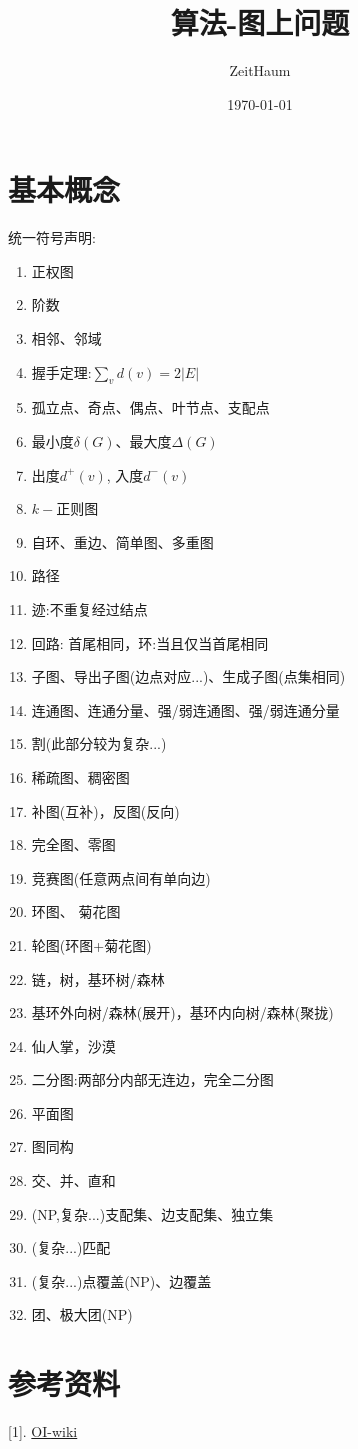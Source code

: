 \documentclass{article}
\author{ZeitHaum}
\date{\today}
\title{算法-图上问题}
\begin{document}
    
    \maketitle
    \newpage 
    \tableofcontents
    \newpage
    \setcounter{page}{1}
    \section{基本概念}
    统一符号声明:
    \begin{enumerate}
        \item 正权图
        \item 阶数
        \item 相邻、邻域
        \item 握手定理:$\sum_{v}d(v) = 2|E|$
        \item 孤立点、奇点、偶点、叶节点、支配点
        \item 最小度$\delta(G)$、最大度$\Delta(G)$
        \item 出度$d^{+}(v)$, 入度$d^{-}(v)$
        \item $k-$正则图
        \item 自环、重边、简单图、多重图
        \item 路径 
        \item 迹:不重复经过结点
        \item 回路: 首尾相同，环:当且仅当首尾相同
        \item 子图、导出子图(边点对应...)、生成子图(点集相同)
        \item 连通图、连通分量、强/弱连通图、强/弱连通分量
        \item 割(此部分较为复杂...)
        \item 稀疏图、稠密图
        \item 补图(互补)，反图(反向)
        \item 完全图、零图
        \item 竞赛图(任意两点间有单向边)
        \item 环图、 菊花图
        \item 轮图(环图+菊花图)
        \item 链，树，基环树/森林
        \item 基环外向树/森林(展开)，基环内向树/森林(聚拢)
        \item 仙人掌，沙漠
        \item 二分图:两部分内部无连边，完全二分图
        \item 平面图
        \item 图同构
        \item 交、并、直和
        \item (NP,复杂...)支配集、边支配集、独立集
        \item (复杂...)匹配
        \item (复杂...)点覆盖(NP)、边覆盖
        \item 团、极大团(NP)
    \end{enumerate}

    \section{}

    \section{参考资料}
    [1]. \href{https://oi-wiki.org/graph/}{OI-wiki}
\end{document}
